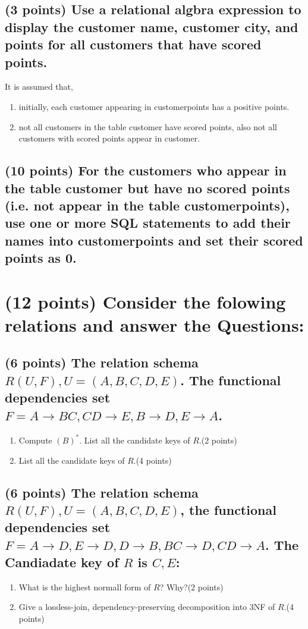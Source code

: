 \documentclass{ctexart}
\begin{document}
\subsection{(3 points) Use a \textbf{relational algbra expression} to display the customer name, customer city, and points for \textbf{all} customers that have scored points.}
It is assumed that,
\begin{enumerate}[label=\alph*)]
    \item initially, each customer appearing in customerpoints has a positive points.
    \item not all customers in the table customer have scored points, also not all customers with scored points appear in customer.
\end{enumerate}
\subsection{(10 points) For the customers who appear in the table customer but have no scored points (i.e. not appear in the table customerpoints), use one or more SQL statements to add their names into customerpoints and set their scored points as 0.}
\section{(12 points) Consider the folowing relations and answer the Questions:}
\subsection{(6 points) The relation schema $R(U,F), U=(A,B,C,D,E)$. The functional dependencies set $F={A\rightarrow BC,CD\rightarrow E,B\rightarrow D,E\rightarrow A}$.}
\begin{enumerate}[label=\Alph*.]
    \item Compute $(B)^*$. List all the candidate keys of $R$.\quad(2 points)
    \item List all the candidate keys of $R$.\quad(4 points)
\end{enumerate}\par
\subsection{(6 points) The relation schema $R(U,F),U=(A,B,C,D,E)$, the functional dependencies set $F={A\rightarrow D,E\rightarrow D,D\rightarrow B,BC\rightarrow D,CD\rightarrow A}$. The Candiadate key of $R$ is ${C,E}$:}
\begin{enumerate}[label=\Alph*.]
    \item What is the highest normall form of $R$? Why?\quad(2 points)
    \item Give a lossless-join, dependency-preserving decomposition into 3NF of $R$.\quad(4 points)
\end{enumerate}\par
\end{document}
